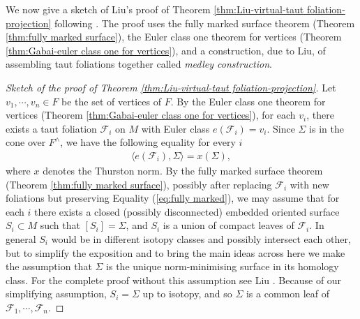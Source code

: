 \documentclass[11pt]{amsart}
\theoremstyle{remark}
\theoremstyle{definition}
\begin{document}
We now give a sketch of Liu's proof of Theorem \ref{thm:Liu-virtual-taut foliation-projection} following \cite{liu2024criterion}. The proof uses the fully marked surface theorem (Theorem \ref{thm:fully marked surface}), the Euler class one theorem for vertices (Theorem \ref{thm:Gabai-euler class one for vertices}), and a construction, due to Liu, of assembling taut foliations together called \emph{medley construction}.

\begin{proof}[Sketch of the proof of Theorem \ref{thm:Liu-virtual-taut foliation-projection}]
	
	Let $v_1, \cdots, v_n \in F$ be the set of vertices of $F$. By the Euler class one theorem for vertices (Theorem \ref{thm:Gabai-euler class one for vertices}), for each $v_i$, there exists a taut foliation $\mathcal{F}_i$ on $M$ with Euler class $e(\mathcal{F}_i) = v_i$. Since $\Sigma$ is in the cone over $F^\wedge$, we have the following equality for every $i$
	\begin{eqnarray}
		\langle e(\mathcal{F}_i) , \Sigma \rangle = x(\Sigma), 
		\label{eq:fully marked}
	\end{eqnarray}
	where $x$ denotes the Thurston norm.
	By the fully marked surface theorem (Theorem \ref{thm:fully marked surface}), possibly after replacing $\mathcal{F}_i$ with new foliations but preserving Equality (\ref{eq:fully marked}), we may assume that for each $i$ there exists a closed (possibly disconnected) embedded oriented surface $S_i \subset M$ such that $[S_i] = \Sigma$, and $S_i$ is a union of compact leaves of $\mathcal{F}_i$. In general $S_i$ would be in different isotopy classes and possibly intersect each other, but to simplify the exposition and to bring the main ideas across here we make the assumption that $\Sigma$ is the unique norm-minimising surface in its homology class. For the complete proof without this assumption see Liu \cite{liu2024criterion}. Because of our simplifying assumption, $S_i = \Sigma$ up to isotopy, and so $\Sigma$ is a common leaf of $\mathcal{F}_1, \cdots, \mathcal{F}_n$. 
	

\end{proof}
\end{document}
